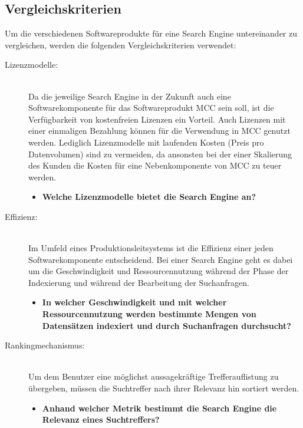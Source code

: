 \subsection{Vergleichskriterien\label{subsec4.2.1:Unterunterpunkt-1}}

Um die verschiedenen Softwareprodukte für eine Search Engine untereinander zu vergleichen, werden die folgenden Vergleichskriterien verwendet:

\begin{description}
    \item[Lizenzmodelle:]\hfill \\
    Da die jeweilige Search Engine in der Zukunft auch eine Softwarekomponente für das Softwareprodukt MCC sein soll, ist die Verfügbarkeit von kostenfreien Lizenzen ein Vorteil. Auch Lizenzen mit einer einmaligen Bezahlung können für die Verwendung in MCC genutzt werden. Lediglich Lizenzmodelle mit laufenden Kosten (Preis pro Datenvolumen) sind zu vermeiden, da ansonsten bei der einer Skalierung des Kunden die Kosten für eine Nebenkomponente von MCC zu teuer werden.
    
    \begin{itemize}
        \item \textbf{Welche Lizenzmodelle bietet die Search Engine an?}
    \end{itemize}

    \item[Effizienz:]\hfill \\
    Im Umfeld eines Produktionsleitsystems ist die Effizienz einer jeden Softwarekomponente entscheidend. Bei einer Search Engine geht es dabei um die Geschwindigkeit und Ressourcennutzung während der Phase der Indexierung und während der Bearbeitung der Suchanfragen.

    \begin{itemize}
        \item \textbf{In welcher Geschwindigkeit und mit welcher Ressourcennutzung werden bestimmte Mengen von Datensätzen indexiert und durch Suchanfragen durchsucht?}
    \end{itemize}
    
    \item[Rankingmechanismus:]\hfill \\
    Um dem Benutzer eine möglichst aussagekräftige Trefferauflistung zu übergeben, müssen die Suchtreffer nach ihrer Relevanz hin sortiert werden.

    \begin{itemize}
        \item \textbf{Anhand welcher Metrik bestimmt die Search Engine die Relevanz eines Suchtreffers?}
    \end{itemize}


\end{description}
